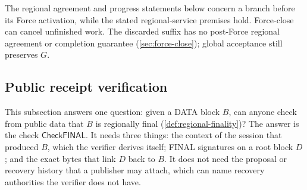 \documentclass[11pt,a4paper]{article}
\newcommand{\tagg}[1]{\ensuremath{\mathsf{#1}}}
\begin{document}
The regional agreement and progress statements below concern a branch
before its Force activation, while the stated regional-service premises
hold. Force-close can cancel unfinished work. The discarded suffix has
no post-Force regional agreement or completion guarantee
(\cref{sec:force-close}); global acceptance still preserves $G$.


\subsection{Public receipt verification}
\label{sec:receipt-kernel}
This subsection answers one question: given a DATA block $B$, can anyone
check from public data that $B$ is regionally final
(\cref{def:regional-finality})? The answer is the check
$\tagg{CheckFINAL}$. It needs three things: the context of the session
that produced $B$, which the verifier derives itself; FINAL signatures
on a root block $D$; and the exact bytes that link $D$ back to $B$. It
does not need the proposal or recovery history that a publisher may
attach, which can name recovery authorities the verifier does not have.
\end{document}
